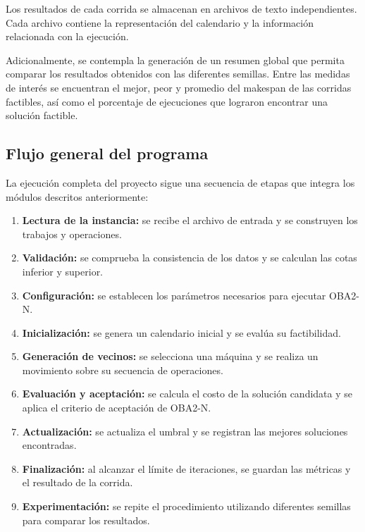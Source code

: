 \documentclass[12pt,a4paper]{article}
\begin{document}
Los resultados de cada corrida se almacenan en archivos de texto independientes. Cada archivo contiene la representación del calendario y la información relacionada con la ejecución.

Adicionalmente, se contempla la generación de un resumen global que permita comparar los resultados obtenidos con las diferentes semillas. Entre las medidas de interés se encuentran el mejor, peor y promedio del makespan de las corridas factibles, así como el porcentaje de ejecuciones que lograron encontrar una solución factible.

\subsection{Flujo general del programa}

La ejecución completa del proyecto sigue una secuencia de etapas que integra los módulos descritos anteriormente:

\begin{enumerate}
    \item \textbf{Lectura de la instancia:} se recibe el archivo de entrada y se construyen los trabajos y operaciones.

    \item \textbf{Validación:} se comprueba la consistencia de los datos y se calculan las cotas inferior y superior.

    \item \textbf{Configuración:} se establecen los parámetros necesarios para ejecutar OBA2-N.

    \item \textbf{Inicialización:} se genera un calendario inicial y se evalúa su factibilidad.

    \item \textbf{Generación de vecinos:} se selecciona una máquina y se realiza un movimiento sobre su secuencia de operaciones.

    \item \textbf{Evaluación y aceptación:} se calcula el costo de la solución candidata y se aplica el criterio de aceptación de OBA2-N.

    \item \textbf{Actualización:} se actualiza el umbral y se registran las mejores soluciones encontradas.

    \item \textbf{Finalización:} al alcanzar el límite de iteraciones, se guardan las métricas y el resultado de la corrida.

    \item \textbf{Experimentación:} se repite el procedimiento utilizando diferentes semillas para comparar los resultados.
\end{enumerate}
\end{document}
